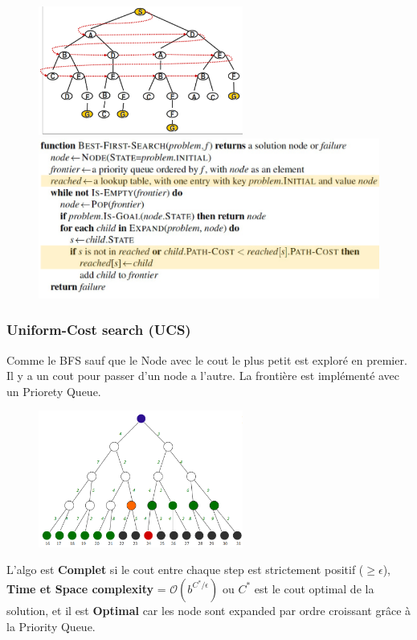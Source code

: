 			\begin{figure}[htp]
				\centering
				\includegraphics[width=0.6\textwidth]{img/BFS.png}
				\includegraphics[width=\textwidth]{img/CodeBFS.png}
			\end{figure}					
		\newpage
		\subsubsection{Uniform-Cost search (UCS)}
			Comme le BFS sauf que le Node avec le cout le plus petit est exploré en premier. Il y a un cout pour passer d'un node a l'autre. La frontière est implémenté avec un Priorety Queue.
			
			\begin{figure}[htp]
				\centering
				\includegraphics[width=0.6\textwidth]{img/UCS.png}
			\end{figure}
			
			L'algo est \textbf{Complet} si le cout entre chaque step est strictement positif ($\geq \epsilon$), \textbf{Time et Space complexity} = $\mathcal{O}(b^{C^{*}/\epsilon})$	ou $C^*$ est le cout optimal de la solution, et il est \textbf{Optimal} car les node sont expanded par ordre croissant grâce à la Priority Queue.
			
